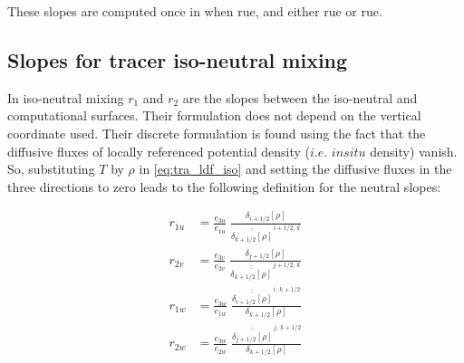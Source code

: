 \documentclass[../tex_main/NEMO_manual]{subfiles}
\begin{document}

These slopes are computed once in  when rue, 
and either rue or rue. 

\subsection{Slopes for tracer iso-neutral mixing}
\label{subsec:LDF_slp_iso}
In iso-neutral mixing  $r_1$ and $r_2$ are the slopes between the iso-neutral 
and computational surfaces. Their formulation does not depend on the vertical 
coordinate used. Their discrete formulation is found using the fact that the 
diffusive fluxes of locally referenced potential density ($i.e.$ $in situ$ density) 
vanish. So, substituting $T$ by $\rho$ in \autoref{eq:tra_ldf_iso} and setting the 
diffusive fluxes in the three directions to zero leads to the following definition for 
the neutral slopes:

\begin{equation} \label{eq:ldfslp_iso}
\begin{split}
 r_{1u} &= \frac{e_{3u}}{e_{1u}}\; \frac{\delta_{i+1/2}[\rho]}
 								{\overline{\overline{\delta_{k+1/2}[\rho]}}^{\,i+1/2,\,k}}
\\
 r_{2v} &= \frac{e_{3v}}{e_{2v}}\; \frac{\delta_{j+1/2}\left[\rho \right]}
 								{\overline{\overline{\delta_{k+1/2}[\rho]}}^{\,j+1/2,\,k}}
\\
 r_{1w} &= \frac{e_{3w}}{e_{1w}}\; 
 			\frac{\overline{\overline{\delta_{i+1/2}[\rho]}}^{\,i,\,k+1/2}}
				 {\delta_{k+1/2}[\rho]}
\\
 r_{2w} &= \frac{e_{3w}}{e_{2w}}\; 
 			\frac{\overline{\overline{\delta_{j+1/2}[\rho]}}^{\,j,\,k+1/2}}
				 {\delta_{k+1/2}[\rho]}
\\
\end{split}
\end{equation}

\end{document}

